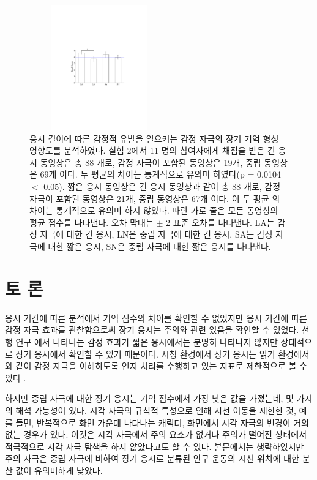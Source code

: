 \documentclass{kcc}
\begin{document}
\begin{figure}
  \centerline{\includegraphics[width=60mm,height=54mm,trim=59mm 100mm 62mm 97mm]{./eps/memtest_nested}}
  \caption{응시 길이에 따른 감정적 유발을 일으키는 감정 자극의 장기 기억 형성 영향도를 분석하였다. 실험 2에서 11 명의 참여자에게 채점을 받은 긴 응시 동영상은 총 88 개로, 감정 자극이 포함된 동영상은 19개, 중립 동영상은 69개 이다. 두 평균의 차이는 통계적으로 유의미 하였다(p = 0.0104 $<$ 0.05). 짧은 응시 동영상은 긴 응시 동영상과 같이 총 88 개로, 감정 자극이 포함된 동영상은 21개, 중립 동영상은 67개 이다. 이 두 평균 의 차이는 통계적으로 유의미 하지 않았다. 파란 가로 줄은 모든 동영상의 평균 점수를 나타낸다. 오차 막대는 $\pm$ 2 표준 오차를 나타낸다. LA는 감정 자극에 대한 긴 응시, LN은 중립 자극에 대한 긴 응시, SA는 감정 자극에 대한 짧은 응시, SN은 중립 자극에 대한 짧은 응시를 나타낸다.}
  \label{fig:memtest-nested}
\end{figure}


\section{토 론}
응시 기간에 따른 분석에서 기억 점수의 차이를 확인할 수 없었지만 응시 기간에 따른 감정 자극 효과를 관찰함으로써 장기 응시는 주의와 관련 있음을 확인할 수 있었다. 선행 연구 \cite{Cahill1996amyg,Cahill1998baso}에서 나타나는 감정 효과가 짧은 응시에서는 분명히 나타나지 않지만 상대적으로 장기 응시에서 확인할 수 있기 때문이다. 시청 환경에서 장기 응시는 읽기 환경에서와 같이 감정 자극을 이해하도록 인지 처리를 수행하고 있는 지표로 제한적으로 볼 수 있다 \cite{Rayner1997}. 

하지만 중립 자극에 대한 장기 응시는 기억 점수에서 가장 낮은 값을 가졌는데, 몇 가지의 해석 가능성이 있다. 시각 자극의 규칙적 특성으로 인해 시선 이동을 제한한 것, 예를 들면, 반복적으로 화면 가운데 나타나는 캐릭터, 화면에서 시각 자극의 변경이 거의 없는 경우가 있다. 이것은 시각 자극에서 주의 요소가 없거나 주의가 떨어진 상태에서 적극적으로 시각 자극 탐색을 하지 않았다고도 할 수 있다. 본문에서는 생략하였지만 주의 자극은 중립 자극에 비하여 장기 응시로 분류된 안구 운동의 시선 위치에 대한 분산 값이 유의미하게 낮았다. 
\end{document}
